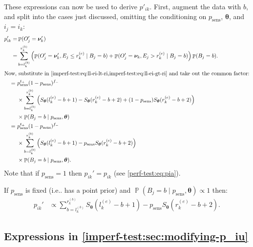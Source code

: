\documentclass[12pt]{article}
\makeatletter
\DeclareMathOperator{\prob}{\mathbb{P}}
\renewcommand{\vec}[1]{\bm{#1}}
\newcommand{\psens}{p_\text{sens}}
\DeclareRobustCommand\onedot{\futurelet\@let@token\@onedot}
\def\@onedot{\ifx\@let@token.\else.\null\fi\xspace}
\def\ie{i.e\onedot} \def\Ie{{I.e}\onedot}
\makeatother
\begin{document}
These expressions can now be used to derive $p'_{ik}$.
First, augment the data with $b$, and split into the cases just discussed, omitting the conditioning on $\psens$, $\vec{\theta}$, and $i_j = i_k$:
\begin{align}
p_{ik}'
=& \prob(O'_j = \vec{\nu}_k') \\
=& \sum_{b = l_k^{(b)}}^{r_k^{(b)}} \left( \prob(O'_j = \vec{\nu}_k', E_j \leq r_k^{(e)} \mid B_j = b) + \prob(O'_j = \vec{\nu}_k, E_j > r_k^{(e)} \mid B_j = b) \right) \prob(B_j = b). \\
\intertext{Now, substitute in \cref{imperf-test:eq:ll-ei-lt-ri,imperf-test:eq:ll-ei-gt-ri} and take out the common factor:}
=\ &  p_\text{sens}^{t_+} (1 - p_\text{sens})^{f_-} \\
 & \times \sum_{b = l_k^{(b)}}^{r_k^{(b)}} \left( S_{\vec{\theta}}(l_k^{(e)} - b + 1) - S_{\vec{\theta}}(r_k^{(e)} - b + 2) + (1 - p_\text{sens}) S_{\vec{\theta}}(r_k^{(e)} - b + 2) \right) \\ 
  & \times \prob(B_j = b \mid p_\text{sens}, \vec{\theta}) \\
=\ &  p_\text{sens}^{t_+} (1 - p_\text{sens})^{f_-} \\
  & \times \sum_{b = l_k^{(b)}}^{r_k^{(b)}} \left( S_{\vec{\theta}}(l_k^{(e)} - b + 1) - p_\text{sens} S_{\vec{\theta}}(r_k^{(e)} - b + 2) \right) \\
  & \times \prob(B_j = b \mid p_\text{sens}, \vec{\theta}).
\label{imperf-test:eq:pia-prime}
\end{align}
Note that if $p_\text{sens} = 1$ then $p_{ik}' = p_{ik}$ (see \cref{perf-test:eq:pia}).

If $\psens$ is fixed (\ie has a point prior) and $\prob(B_j = b \mid \psens, \vec{\theta}) \propto 1$ then:
\begin{align}
p_{ik}'
&\propto \sum_{b = l_k^{(b)}}^{r_k^{(b)}} S_{\vec{\theta}}(l_k^{(e)} - b + 1) - p_\text{sens} S_{\vec{\theta}}(r_k^{(e)} - b + 2).
\label{imperf-test:eq:pia-prime-constant}
\end{align}

\subsection{Expressions in \cref{imperf-test:sec:modifying-p_iu}} \label{sec:p-iu-dash}
\end{document}
